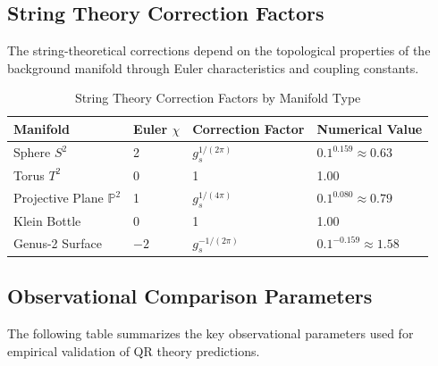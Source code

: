 \subsection{String Theory Correction Factors}
\label{subsec:string-correction-factors}

The string-theoretical corrections depend on the topological properties of the background manifold through Euler characteristics and coupling constants.

\begin{table}[H]
  \caption{String Theory Correction Factors by Manifold Type}
  \label{tab:string-corrections-complete}
  \centering
  \begin{tabular}{@{}llll@{}}
    \toprule
    \textbf{Manifold} & \textbf{Euler $\chi$} & \textbf{Correction Factor} & \textbf{Numerical Value} \\
    \midrule
    Sphere $S^2$                & 2  & $g_s^{1/(2\pi)}$   & $0.1^{0.159} \approx 0.63$ \\
    Torus $T^2$                 & 0  & 1                  & 1.00 \\
    Projective Plane $\mathbb{P}^2$ & 1  & $g_s^{1/(4\pi)}$   & $0.1^{0.080} \approx 0.79$ \\
    Klein Bottle                 & 0  & 1                  & 1.00 \\
    Genus-2 Surface             & $-2$ & $g_s^{-1/(2\pi)}$ & $0.1^{-0.159} \approx 1.58$ \\
    \bottomrule
  \end{tabular}
\end{table}

\subsection{Observational Comparison Parameters}
\label{subsec:observational-parameters}

The following table summarizes the key observational parameters used for empirical validation of QR theory predictions.

